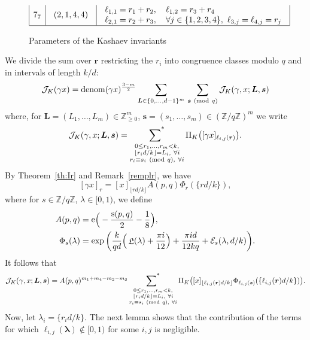 \documentclass[11pt]{amsart}
\newcommand{\Z}{\mathbb{Z}}
\newcommand{\br}{{\boldsymbol r}}
\newcommand{\bL}{{\boldsymbol L}}
\newcommand{\bss}{{\boldsymbol s}}
\newcommand{\J}{\mathcal{J}}
\renewcommand{\mod}[1]{~\pr{\textnormal{mod}~#1}}
\newcommand{\Er}{{\mathcal E}}
\theoremstyle{definition}
\newcommand{\ssumstar}[1]{\operatornamewithlimits{\sum\nolimits^*}_{\substack{#1}}}
\newcommand{\pr}[1]{\mathchoice{\left( #1\right)}{(#1)}{(#1)}{(#1)}}
\newcommand{\floor}[1]{{\left\lfloor {#1} \right\rfloor}}
\newcommand{\e}[1][]{\ifthenelse{\equal{#1}{}}{{\rm e}}{\operatorname{e}\pr{ #1}}}
\DeclareMathOperator{\Lie}{{\mathfrak L}}
\DeclareMathOperator{\denom}{denom}
\newcommand{\bs}{\boldsymbol }
\DeclareMathOperator{\deks}{s}
\newcommand{\1}{{\mathbf 1}}
\let\originalleft\left
\let\originalright\right
\renewcommand{\left}{\mathopen{}\mathclose\bgroup\originalleft}
\renewcommand{\right}{\aftergroup\egroup\originalright}
\numberwithin{equation}{section}
\begin{document}
\begin{figure}[h]
\begin{equation*}
\begin{array}{|c|c|l|l|}
      7_7 &
      \begin{array}{l}
        (2, 1, 4, 4)
      \end{array} & 
      \begin{array}{l}
        \ell_{1,1}=r_1+r_2, \quad \ell_{1,2}=r_3+r_4 \\
        \ell_{2,1}=r_2+r_3, \quad \forall j\in\{1, 2, 3, 4\},\ \ell_{3,j}=\ell_{4,j}=r_j
      \end{array} \\ \hline
    \end{array}
  \end{equation*}
  \caption{Parameters of the Kashaev invariants}
  \label{fig:table-K-param}
\end{figure}


We divide the sum over $\br$ restricting the $r_i$ into congruence classes modulo $q$ and in intervals of length $k/d$:
\begin{align}\label{splj}
  \J_{K}(\gamma x) = \denom(\gamma x)^{\frac{3-m}2} \sum_{\bs L\in\{0,\dots,d-1\}^m}\,\sum_{\bs s\mod q} \J_K(\gamma, x; \boldsymbol L,\boldsymbol s)
\end{align}
where, for $\boldsymbol L=(L_1,\dots,L_m)\in\Z_{\geq 0}^m$, $\boldsymbol s=(s_1,\dots,s_m)\in(\Z/q\Z)^m$ we write
\begin{align*}
  \J_K(\gamma, x; \bL, \bss) =   \ssumstar{0\leq r_1,\dots, r_m<k,\\  \floor{r_i d/k}=L_i,\ \forall i\\ r_i\equiv s_i \mod{q},\ \forall i}
  \Pi_K\big([\gamma x]_{\ell_{i,j}(\boldsymbol r)}\big).
\end{align*}
By Theorem~\ref{th:Ir} and Remark~\ref{remplr}, we have
$$ [\gamma x]_{r} = [x]_{\lfloor r d/k\rfloor} A(p,q) \Phi_{r}(\{r d/k\}), $$
where for $s\in\Z/q\Z$, $\lambda\in[0,1)$, we define
\begin{align} 
  A(p,q) &= \e\Big( - \frac{\deks(p,q)}2 - \frac 18\Big), \notag\\
  \Phi_{s}(\lambda) &= \exp\bigg(\frac k{qd} \Big(\Lie(\lambda) +\frac{\pi i }{12}\Big)+\frac{\pi i d}{12kq}+ \Er_s(\lambda,d/k) \bigg). \label{defb}
\end{align}
It follows that
\begin{align*}
  \J_K(\gamma, x; \bL, \bss) =   A(p,q)^{m_1+m_4-m_2-m_3} \ssumstar{0\leq r_1,\dots, r_m<k,\\  \floor{r_i d/k}=L_i,\ \forall i\\ r_i\equiv s_i \mod{q},\ \forall i}
  \Pi_K\big([x]_{\lfloor \ell_{i,j}(\boldsymbol r) d/k\rfloor} \Phi_{\ell_{i,j}(\boldsymbol s)}(\{\ell_{i,j}(\boldsymbol r) d/k\})\big).
\end{align*}
Now, let $\lambda_i=\{r_i d/k\}$.
The next lemma shows that the contribution of the terms for which $\ell_{i,j}(\bs \lambda)\notin[0,1)$ for some $i,j$ is negligible.
\end{document}
